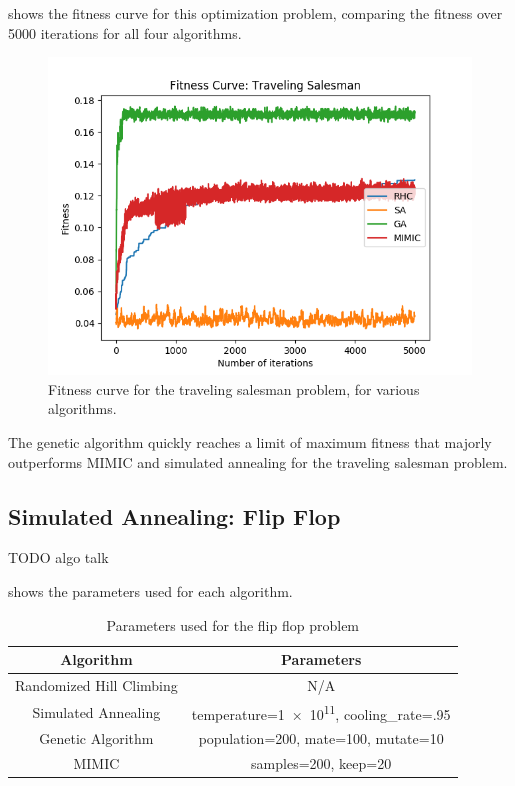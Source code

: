 \documentclass{article}
\begin{document}
       shows the fitness curve for this optimization problem, comparing the fitness over 5000 iterations for all four algorithms.

      \begin{figure}[htb]
      \centering
      \includegraphics[width=.5\linewidth]{out/op/salesman/fitness.png}
      \caption{Fitness curve for the traveling salesman problem, for various algorithms.}
      \label{fig:fitness-ts}
      \end{figure}

      The genetic algorithm quickly reaches a limit of maximum fitness that majorly outperforms MIMIC and simulated annealing for the traveling salesman problem.

    \subsection{Simulated Annealing: Flip Flop}
      TODO algo talk

       shows the parameters used for each algorithm.

      \begin{table}[h!]
      \centering
        \begin{tabular}{||c|c||}\hline
          \textbf{Algorithm} & \textbf{Parameters} \\ \hline
          Randomized Hill Climbing & N/A \\ \hline
          Simulated Annealing & temperature=\num{1e11}, cooling\_rate=.95 \\ \hline
          Genetic Algorithm & population=200, mate=100, mutate=10 \\ \hline
          MIMIC & samples=200, keep=20 \\ \hline
        \end{tabular}

        \caption{Parameters used for the flip flop problem}
        \label{tab:ff-params}
      \end{table}
\end{document}
